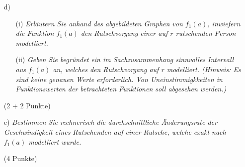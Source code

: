\documentclass[ngerman, a4paper, 11pt]{article}
\begin{document}
\begin{figure}[h]
    \centering
\end{figure}

\begin{enumerate}
    \item[d)]
        \begin{enumerate}
            \item[(i)]
                \textit{Erläutern Sie anhand des abgebildeten Graphen von $f_{1}(a)$, inwiefern die Funktion $f_{1}(a)$ den Rutschvorgang einer auf $r$ rutschenden Person modelliert. }
            \item[(ii)]
                \textit{Geben Sie begründet ein im Sachzusammenhang sinnvolles Intervall aus $f_{1}(a)$ an, welches den Rutschvorgang auf $r$ modelliert. (Hinweis: Es sind keine genauen Werte erforderlich. Von Uneinstimmigkkeiten in Funktionswerten der betrachteten Funktionen soll abgesehen werden.)}
        \end{enumerate}
        \begin{flushright}
            (2 + 2 Punkte)
        \end{flushright}
\end{enumerate}

\begin{enumerate}
    \item[e)]
        \textit{Bestimmen Sie rechnerisch die durchschnittliche Änderungsrate der Geschwindigkeit eines Rutschenden auf einer Rutsche, welche exakt nach $f_{1}(a)$ modelliert wurde.}
        \begin{flushright}
            (4 Punkte)
        \end{flushright}
\end{enumerate}


\end{document}
